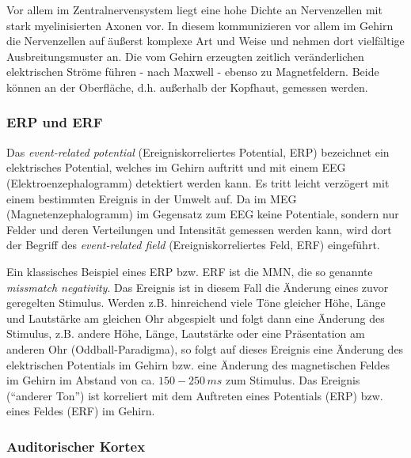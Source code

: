 \documentclass[doc,a4paper,12pt]{apa6}
\begin{document}
Vor allem im Zentralnervensystem liegt eine hohe Dichte an Nervenzellen mit stark myelinisierten Axonen vor. In diesem kommunizieren vor allem im Gehirn die Nervenzellen auf äußerst komplexe Art und Weise und nehmen dort vielfältige Ausbreitungsmuster an. Die vom Gehirn erzeugten zeitlich veränderlichen elektrischen Ströme führen - nach Maxwell - ebenso zu Magnetfeldern. Beide können an der Oberfläche, d.h. außerhalb der Kopfhaut, gemessen werden.

\subsubsection{ERP und ERF}
\label{sec:erf}

Das \emph{event-related potential} (Ereigniskorreliertes Potential, ERP) bezeichnet ein elektrisches Potential, welches im Gehirn auftritt und mit einem EEG (Elektroenzephalogramm) detektiert werden kann. Es tritt leicht verzögert mit einem bestimmten Ereignis in der Umwelt auf. Da im MEG (Magnetenzephalogramm) im Gegensatz zum EEG keine Potentiale, sondern nur Felder und deren Verteilungen und Intensität gemessen werden kann, wird dort der Begriff des \emph{event-related field} (Ereigniskorreliertes Feld, ERF) eingeführt.

Ein klassisches Beispiel eines ERP bzw. ERF ist die MMN, die so genannte \emph{missmatch negativity}. Das Ereignis ist in diesem Fall die Änderung eines zuvor geregelten Stimulus. Werden z.B. hinreichend viele Töne gleicher Höhe, Länge und Lautstärke am gleichen Ohr abgespielt und folgt dann eine Änderung des Stimulus, z.B. andere Höhe, Länge, Lautstärke oder eine Präsentation am anderen Ohr (Oddball-Paradigma), so folgt auf dieses Ereignis eine Änderung des elektrischen Potentials im Gehirn bzw. eine Änderung des magnetischen Feldes im Gehirn im Abstand von ca. $150-250\,ms$ zum Stimulus. Das Ereignis (``anderer Ton'') ist korreliert mit dem Auftreten eines Potentials (ERP) bzw. eines Feldes (ERF) im Gehirn.

\subsubsection{Auditorischer Kortex}
\label{sec:audicort}
\end{document}
